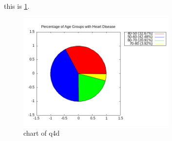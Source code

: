 \documentclass{article}
\begin{document}
this is \ref{fig:4}. \\
\begin{figure}[ht]
    \centering
    \includegraphics[width=0.7\textwidth]{4d.png}  %
    \caption{chart of q4d}
    \label{fig:4}
\end{figure}
\end{document}
